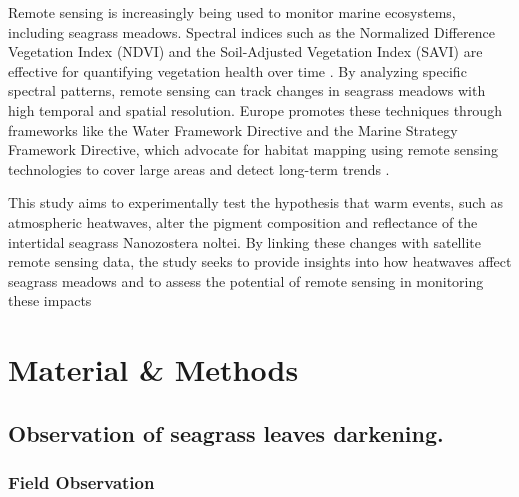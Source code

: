 \documentclass[
  number]{elsarticle}
\begin{document}
Remote sensing is increasingly being used to monitor marine ecosystems,
including seagrass meadows. Spectral indices such as the Normalized
Difference Vegetation Index (NDVI) and the Soil-Adjusted Vegetation
Index (SAVI) are effective for quantifying vegetation health over time
\citep{huete2012vegetation, kloos2021agricultural, carlan2020identifying, akbar2020mangrove}.
By analyzing specific spectral patterns, remote sensing can track
changes in seagrass meadows with high temporal and spatial resolution.
Europe promotes these techniques through frameworks like the Water
Framework Directive and the Marine Strategy Framework Directive, which
advocate for habitat mapping using remote sensing technologies to cover
large areas and detect long-term trends
\citep{papathanasopoulou2019satellite}.

This study aims to experimentally test the hypothesis that warm events,
such as atmospheric heatwaves, alter the pigment composition and
reflectance of the intertidal seagrass Nanozostera noltei. By linking
these changes with satellite remote sensing data, the study seeks to
provide insights into how heatwaves affect seagrass meadows and to
assess the potential of remote sensing in monitoring these impacts

\section{Material \& Methods}\label{material-methods}

\subsection{Observation of seagrass leaves
darkening.}\label{observation-of-seagrass-leaves-darkening.}

\subsubsection{Field Observation}\label{field-observation}
\end{document}
